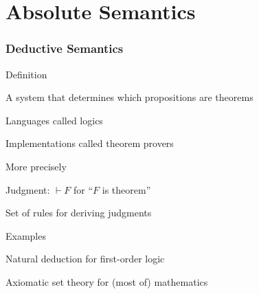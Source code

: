 %

\section{Absolute Semantics}

\begin{frame}\frametitle{Deductive Semantics}
\begin{blockitems}{Definition}
\item A system that determines which propositions are theorems
\item Languages called logics
\item Implementations called theorem provers
\end{blockitems}

\begin{blockitems}{More precisely}
\item Judgment: $\vdash F$ for ``$F$ is theorem''
\item Set of rules for deriving judgments
\end{blockitems}

\begin{blockitems}{Examples}
\item Natural deduction for first-order logic
\item Axiomatic set theory for (most of) mathematics
\end{blockitems}
\end{frame}

